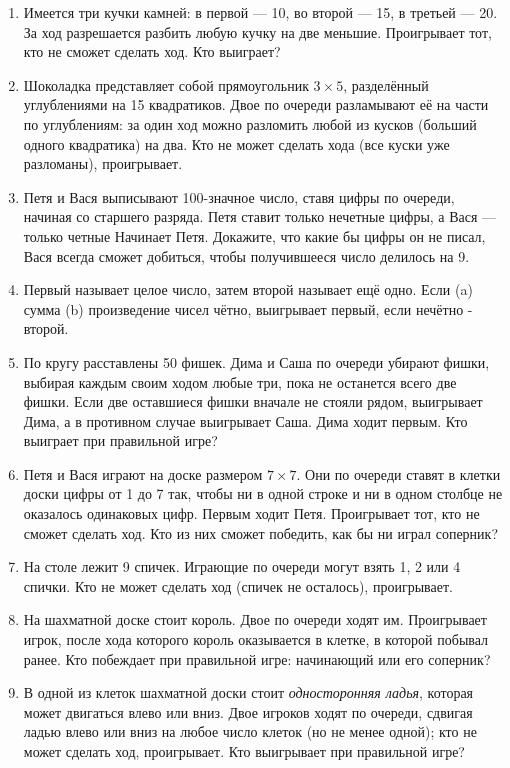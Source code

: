 \documentclass{article}
\begin{document}
\begin{enumerate}[label*=\protect\fbox{\arabic{enumi}}]
\item Имеется три кучки камней: в первой --- 10, во второй --- 15, в третьей --- 20. За ход разрешается разбить любую кучку на две меньшие. Проигрывает тот, кто не сможет сделать ход. Кто выиграет?

\item Шоколадка представляет собой прямоугольник $3 \times 5$, разделённый углублениями на 15 квадратиков. Двое по очереди разламывают её на части по углублениям: за один ход можно разломить любой из кусков (больший одного квадратика) на два. Кто не может сделать хода (все куски уже разломаны), проигрывает.

\item Петя и Вася выписывают 100-значное число, ставя цифры по очереди, начиная со старшего разряда. Петя ставит только нечетные цифры, а Вася — только четные Начинает Петя. Докажите, что какие бы цифры он не писал, Вася всегда сможет добиться, чтобы получившееся число делилось на 9.

\item Первый называет целое число, затем второй называет ещё одно. Если (a) сумма (b) произведение чисел чётно, выигрывает первый, если нечётно - второй.

\item По кругу расставлены 50 фишек. Дима и Саша по очереди убирают фишки, выбирая каждым своим ходом любые три, пока не останется всего две фишки. Если две оставшиеся фишки вначале не стояли рядом, выигрывает Дима, а в противном случае выигрывает Саша. Дима ходит первым. Кто выиграет при правильной игре?

\item Петя и Вася играют на доске размером $7 \times 7$. Они по очереди ставят в клетки доски цифры от 1 до 7 так, чтобы ни в одной строке и ни в одном столбце не оказалось одинаковых цифр. Первым ходит Петя. Проигрывает тот, кто не сможет сделать ход. Кто из них сможет победить, как бы ни играл соперник?

\item  На столе лежит 9 спичек. Играющие по очереди могут взять 1, 2 или 4 спички. Кто не может сделать ход (спичек не осталось), проигрывает.

\item На шахматной доске стоит король. Двое по очереди ходят им. Проигрывает игрок, после хода которого король оказывается в клетке, в которой побывал ранее. Кто побеждает при правильной игре: начинающий или его соперник?

\item В одной из клеток шахматной доски стоит \textit{односторонняя ладья}, которая может двигаться влево или вниз. Двое игроков ходят по очереди, сдвигая ладью влево или вниз на любое число клеток (но не менее одной); кто не может сделать ход, проигрывает. Кто выигрывает при правильной игре?


\end{enumerate}
\end{document}
